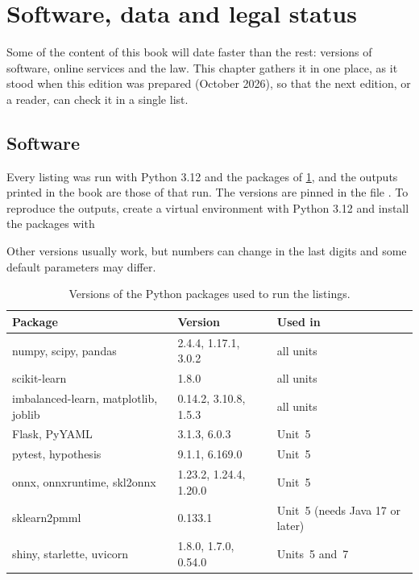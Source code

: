 \chapter*{Software, data and legal status}\label{ch:status}
{}

Some of the content of this book will date faster than the rest: versions of software, online
services and the law. This chapter gathers it in one place, as it stood when this edition was
prepared (October 2026), so that the next edition, or a reader, can check it in a single list.

\section*{Software}

\begin{sloppypar}
Every listing was run with Python 3.12 and the packages of \cref{tab:versions}, and the outputs printed in the book are those of that run. The versions are pinned in the file
. To
reproduce the outputs, create a virtual environment with Python 3.12 and install the packages with
\begin{center}\end{center} Other versions usually work, but numbers can change in
the last digits and some default parameters may differ.
\end{sloppypar}

\begin{table}[htbp]
\centering\small
\caption{Versions of the Python packages used to run the listings.}\label{tab:versions}
\begin{tabular}{@{}lll@{}}
\toprule
Package & Version & Used in\\
\midrule
numpy, scipy, pandas & 2.4.4, 1.17.1, 3.0.2 & all units\\
scikit-learn & 1.8.0 & all units\\
imbalanced-learn, matplotlib, joblib & 0.14.2, 3.10.8, 1.5.3 & all units\\
Flask, PyYAML & 3.1.3, 6.0.3 & Unit~5\\
pytest, hypothesis & 9.1.1, 6.169.0 & Unit~5\\
onnx, onnxruntime, skl2onnx & 1.23.2, 1.24.4, 1.20.0 & Unit~5\\
sklearn2pmml & 0.133.1 & Unit~5 (needs Java 17 or later)\\
shiny, starlette, uvicorn & 1.8.0, 1.7.0, 0.54.0 & Units~5 and~7\\
\bottomrule
\end{tabular}
\end{table}

